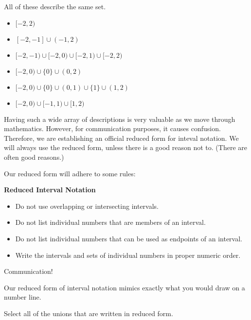 \documentclass{ximera}
\begin{document}
All of these describe the same set.

\begin{itemize}
\item $[-2, 2)$
\item $[-2, -1] \cup (-1, 2)$
\item $[-2, -1) \cup [-2, 0) \cup [-2, 1) \cup [-2, 2)$
\item $[-2, 0) \cup \{ 0 \} \cup (0, 2)$
\item $[-2, 0) \cup \{ 0 \} \cup (0, 1) \cup \{ 1 \} \cup (1, 2)$
\item $[-2, 0) \cup [-1, 1) \cup [1, 2)$
\end{itemize}

Having such a wide array of descriptions is very valuable as we move through mathematics.  However, for communication purposes, it causes confusion. Therefore, we are establishing an official reduced form for inteval notation.  We will always use the reduced form, unless there is a good reason not to.  (There are often good reasons.)

Our reduced form will adhere to some rules:





\begin{notation} \textbf{\textcolor{blue!75!black}{Reduced Interval Notation}} \\

\begin{itemize}
\item Do not use overlapping or intersecting intervals.
\item Do not list individual numbers that are members of an interval.
\item Do not list individual numbers that can be used as endpoints of an interval.
\item Write the intervals and sets of individual numbers in proper numeric order.
\end{itemize}

\end{notation}
Communication!

Our reduced form of interval notation mimics exactly what you would draw on a number line.




\begin{question}
Select all of the unions that are written in reduced form.
  \begin{selectAll}
  \choice {$[-3, 4) \cup (2, 7)$}
  \choice {$(-3, 2] \cup [4, 7] \cup \{ 3 \}$}
  \choice [correct]{$[-3, 2) \cup \{ 3 \} \cup (4, 7)$}
  \choice {$(4, 7) \cup [-3, 2)$}
  \end{selectAll}
\end{question}
\end{document}
